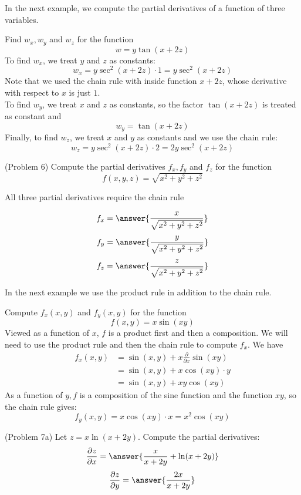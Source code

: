 \documentclass[handout]{ximera}
\begin{document}
In the next example, we compute the partial derivatives of a function of three variables.

\begin{example}[Example 6]
Find $w_x, w_y$ and $w_z$ for the function
\[
w = y\tan(x+2z)
\]
To find $w_x$, we treat $y$ and $z$ as constants:
\[
w_x = y\sec^2(x+2z) \cdot 1 = y\sec^2(x+2z)
\]
Note that we used the chain rule with inside function $x + 2z$, whose derivative with respect to $x$ is just $1$.\\
To find $w_y$, we treat $x$ and $z$ as constants, so the factor $\tan(x+2z)$ is treated as constant and
\[
w_y = \tan(x+2z)
\]
Finally, to find $w_z$, we treat $x$ and $y$ as constants and we use the chain rule:
\[
w_z = y\sec^2(x+2z) \cdot 2 = 2y\sec^2(x+2z)
\]
\end{example}

\begin{problem}(Problem 6)
Compute the partial derivatives $f_x, f_y$ and $f_z$ for the function
\[
f(x,y,z) = \sqrt{x^2 + y^2 + z^2}
\]
\begin{hint}
All three partial derivatives require the chain rule
\end{hint}
\[
f_x = \answer{\frac{x}{\sqrt{x^2 + y^2 + z^2}}}
\]
\[
f_y = \answer{\frac{y}{\sqrt{x^2 + y^2 + z^2}}}
\]
\[
f_z = \answer{\frac{z}{\sqrt{x^2 + y^2 + z^2}}}
\]

\end{problem}

In the next example we use the product rule in addition to the chain rule.

\begin{example}[Example 7]
Compute $f_x(x,y)$ and $f_y(x,y)$ for the function 
\[
f(x,y) = x\sin(xy)
\]
Viewed as a function of $x$, $f$ is a product first and then a composition. We will need to use the product rule and then
the chain rule to compute $f_x$.
We have
\begin{align*}
f_x(x,y) &= \sin(x,y) + x \frac{\partial}{\partial x} \sin(xy)\\
         & = \sin(x,y) + x \cos(xy) \cdot y\\
         & = \sin(x,y) + xy \cos(xy)
\end{align*}
As a function of $y, f$ is a composition of the sine function and the function $xy$, so the chain rule gives:
\[
f_y(x,y) = x \cos(xy) \cdot x = x^2 \cos(xy)
\]

\end{example}


\begin{problem}(Problem 7a)
Let $z = x\ln(x+ 2y)$. Compute the partial derivatives:
\[
\frac{\partial z}{\partial x} = \answer{\frac{x}{x+2y} + \ln(x+2y)}
\]
\[
\frac{\partial z}{\partial y} = \answer{\frac{2x}{x+2y}}
\]
\end{problem}
\end{document}
